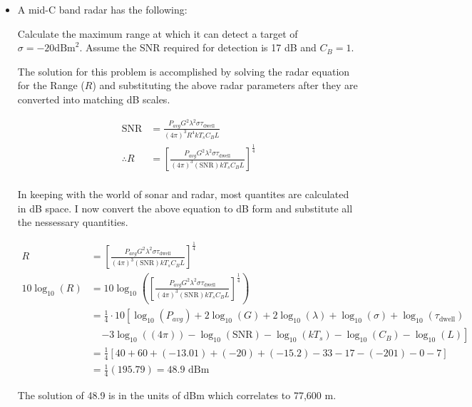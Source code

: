 \documentclass[letterpaper,10pt]{article}\usepackage[]{graphicx}\usepackage[]{color}
\newcommand{\question}[3]{
\begin{itemize}
\item[{\makebox[1cm]{#1)}}] #2

\vspace{.2in}

#3

\end{itemize}

\vspace{.2in}
}
\begin{document}
\question{1.3}
{A mid-C band radar has the following:


Calculate the maximum range at which it can detect a target of $\sigma=-20 \text{dBm}^2$. Assume the SNR required for detection is 17 dB and $C_B=1$.
}
{

The solution for this problem is accomplished by solving the radar equation for the Range ($R$) and substituting the above radar parameters after they are converted into matching dB scales.

\begin{align*}
\text{SNR} & = \frac{P_{avg}G^2\lambda^2\sigma\tau_\text{dwell}}{(4\pi)^3R^4kT_sC_BL} \\
\therefore R & = \left[\frac{P_{avg}G^2\lambda^2\sigma\tau_\text{dwell}}{(4\pi)^3(\text{SNR})kT_sC_BL}\right]^{\frac{1}{4}} \\
\end{align*}

In keeping with the world of sonar and radar, most quantites are calculated in dB space.  I now convert the above equation to dB form and substitute all the nessessary quantities.

\begin{align*}
R & = \left[\frac{P_{avg}G^2\lambda^2\sigma\tau_\text{dwell}}{(4\pi)^3(\text{SNR})kT_sC_BL}\right]^{\frac{1}{4}} \\
10\log_{10}(R) & = 10\log_{10}\left(\left[\frac{P_{avg}G^2\lambda^2\sigma\tau_\text{dwell}}{(4\pi)^3(\text{SNR})kT_sC_BL}\right]^{\frac{1}{4}}\right)\\
& = \frac{1}{4}\cdot 10 \left[\log_{10}(P_{avg}) + 2\log_{10}(G) + 2\log_{10}(\lambda) + \log_{10}(\sigma) + \log_{10}(\tau_\text{dwell})\right.\\
& \ \ \ \ \ \left. - 3\log_{10}((4\pi)) - \log_{10}(\text{SNR}) - \log_{10}(kT_s) - \log_{10}(C_B) - \log_{10}(L)\right]\\
& = \frac{1}{4}\left[40 + 60 + (-13.01) + (-20) + (-15.2) - 33 - 17 - (-201) - 0 - 7\right]\\
& = \frac{1}{4}(195.79) = 48.9 \text{ dBm}
\end{align*}

The solution of 48.9 is in the units of dBm which correlates to 77,600 m.
}
\end{document}

